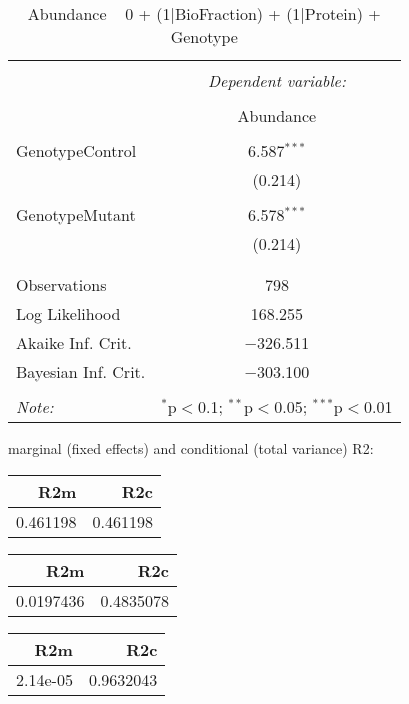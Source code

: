 \documentclass[11pt]{report}
\begin{document}
\begin{table}[!htbp] \centering 
  \caption{Abundance ~ 0 + (1|BioFraction) + (1|Protein) + Genotype} 
  \label{} 
\begin{tabular}{@{\extracolsep{5pt}}lc} 
\\[-1.8ex]\hline 
\hline \\[-1.8ex] 
 & \multicolumn{1}{c}{\textit{Dependent variable:}} \\ 
\cline{2-2} 
\\[-1.8ex] & Abundance \\ 
\hline \\[-1.8ex] 
 GenotypeControl & 6.587$^{***}$ \\ 
  & (0.214) \\ 
  & \\ 
 GenotypeMutant & 6.578$^{***}$ \\ 
  & (0.214) \\ 
  & \\ 
\hline \\[-1.8ex] 
Observations & 798 \\ 
Log Likelihood & 168.255 \\ 
Akaike Inf. Crit. & $-$326.511 \\ 
Bayesian Inf. Crit. & $-$303.100 \\ 
\hline 
\hline \\[-1.8ex] 
\textit{Note:}  & \multicolumn{1}{r}{$^{*}$p$<$0.1; $^{**}$p$<$0.05; $^{***}$p$<$0.01} \\ 
\end{tabular} 
\end{table} 
marginal (fixed effects) and conditional (total variance) R2:

\begin{tabular}{r|r}
\hline
R2m & R2c\\
\hline
0.461198 & 0.461198\\
\hline
\end{tabular}

\begin{tabular}{r|r}
\hline
R2m & R2c\\
\hline
0.0197436 & 0.4835078\\
\hline
\end{tabular}

\begin{tabular}{r|r}
\hline
R2m & R2c\\
\hline
2.14e-05 & 0.9632043\\
\hline
\end{tabular}
\end{document}
